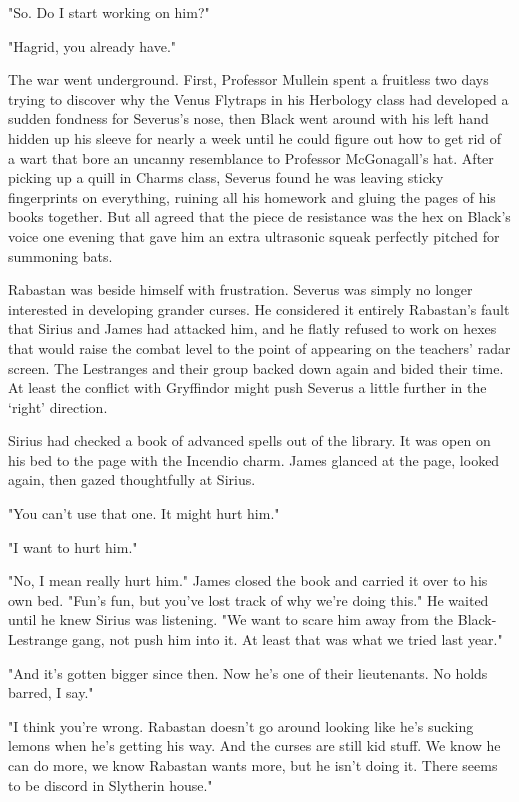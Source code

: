 "So. Do I start working on him?"

"Hagrid, you already have."

The war went underground. First, Professor Mullein spent a fruitless two days trying to discover why the Venus Flytraps in his Herbology class had developed a sudden fondness for Severus's nose, then Black went around with his left hand hidden up his sleeve for nearly a week until he could figure out how to get rid of a wart that bore an uncanny resemblance to Professor McGonagall's hat. After picking up a quill in Charms class, Severus found he was leaving sticky fingerprints on everything, ruining all his homework and gluing the pages of his books together. But all agreed that the piece de resistance was the hex on Black's voice one evening that gave him an extra ultrasonic squeak perfectly pitched for summoning bats.

Rabastan was beside himself with frustration. Severus was simply no longer interested in developing grander curses. He considered it entirely Rabastan's fault that Sirius and James had attacked him, and he flatly refused to work on hexes that would raise the combat level to the point of appearing on the teachers' radar screen. The Lestranges and their group backed down again and bided their time. At least the conflict with Gryffindor might push Severus a little further in the `right' direction.

Sirius had checked a book of advanced spells out of the library. It was open on his bed to the page with the Incendio charm. James glanced at the page, looked again, then gazed thoughtfully at Sirius.

"You can't use that one. It might hurt him."

"I want to hurt him."

"No, I mean really hurt him." James closed the book and carried it over to his own bed. "Fun's fun, but you've lost track of why we're doing this." He waited until he knew Sirius was listening. "We want to scare him away from the Black-Lestrange gang, not push him into it. At least that was what we tried last year."

"And it's gotten bigger since then. Now he's one of their lieutenants. No holds barred, I say."

"I think you're wrong. Rabastan doesn't go around looking like he's sucking lemons when he's getting his way. And the curses are still kid stuff. We know he can do more, we know Rabastan wants more, but he isn't doing it. There seems to be discord in Slytherin house."

